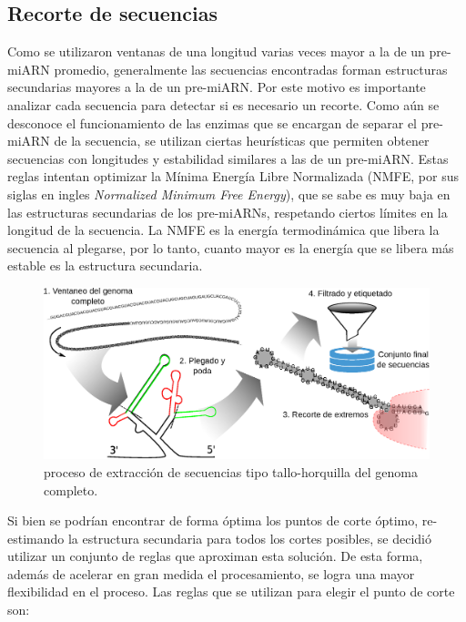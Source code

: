 \subsection{Recorte de secuencias}

Como se utilizaron ventanas de una longitud varias veces mayor a la de un pre-miARN promedio, generalmente las secuencias encontradas forman estructuras
secundarias mayores a la de un pre-miARN. Por este motivo es importante analizar cada secuencia para detectar si es necesario un recorte. Como aún se
desconoce el funcionamiento de las enzimas que se encargan de separar el pre-miARN de la secuencia, se utilizan ciertas heurísticas que permiten obtener
secuencias con longitudes y estabilidad similares a las de un pre-miARN. Estas reglas intentan optimizar la Mínima Energía Libre Normalizada (NMFE, por
sus siglas en ingles \textit{Normalized Minimum Free Energy}), que se sabe es muy baja en las estructuras secundarias de los pre-miARNs, respetando ciertos
límites en la longitud de la secuencia. La NMFE es la energía termodinámica que libera la secuencia al plegarse, por lo tanto, cuanto mayor es la energía
que se libera más estable es la estructura secundaria.

\begin{figure}[t]
	\centering
	\includegraphics[width=\textwidth]{fig/hextractor.eps}
	\caption[Extracción de secuencias tipo tallo-horquilla]{proceso de extracción de secuencias tipo tallo-horquilla del genoma completo.}
	\label{fig:hextractor}
\end{figure}

Si bien se podrían encontrar de forma óptima los puntos de corte óptimo, re-estimando la estructura secundaria para todos los cortes posibles, se decidió
utilizar un conjunto de reglas que aproximan esta solución. De esta forma, además de acelerar en gran medida el procesamiento, se logra una mayor
flexibilidad en el proceso. Las reglas que se utilizan para elegir el punto de corte son:

